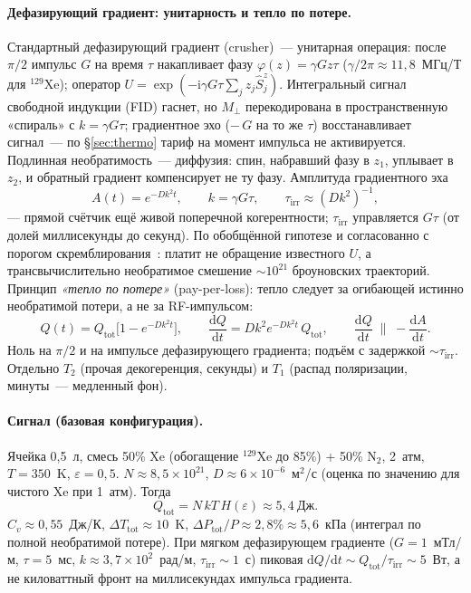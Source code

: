 \documentclass[11pt,a4paper]{article}
\newcommand{\Sref}[1]{\hyperref[#1]{\S\ref{#1}}}
\begin{document}
\paragraph{Дефазирующий градиент: унитарность и тепло по потере.}
Стандартный дефазирующий градиент (crusher)~--- унитарная операция: после $\pi/2$ импульс $G$ на время $\tau$ накапливает фазу $\varphi(z)=\gamma G z\tau$ ($\gamma/2\pi \approx 11{,}8$~МГц/Т для $^{129}$Xe); оператор $U=\exp(-\mathrm{i}\gamma G\tau\sum_j z_j\hat S_j^z)$. Интегральный сигнал свободной индукции (FID) гаснет, но $M_\perp$ перекодирована в пространственную «спираль» с $k=\gamma G\tau$; градиентное эхо ($-\,G$ на то же $\tau$) восстанавливает сигнал~--- по \Sref{sec:thermo} тариф на момент импульса не активируется. Подлинная необратимость~--- диффузия: спин, набравший фазу в $z_1$, уплывает в $z_2$, и обратный градиент компенсирует не ту фазу. Амплитуда градиентного эха
\begin{equation}
A(t)=e^{-Dk^2 t}, \qquad k=\gamma G\tau, \qquad \tau_{\mathrm{irr}}\approx (Dk^2)^{-1},
\end{equation}
--- прямой счётчик ещё живой поперечной когерентности; $\tau_{\mathrm{irr}}$ управляется $G\tau$ (от долей миллисекунды до секунд). По обобщённой гипотезе и согласованно с порогом скремблирования~\cite{ponfilenok2026threshold}: платит не обращение известного $U$, а трансвычислительно необратимое смешение $\sim 10^{21}$ броуновских траекторий. Принцип \emph{«тепло по потере»} (pay-per-loss): тепло следует за огибающей истинно необратимой потери, а не за RF-импульсом:
\begin{equation}
Q(t)=Q_{\mathrm{tot}}\bigl[1-e^{-Dk^2 t}\bigr], \qquad
\frac{\mathrm{d} Q}{\mathrm{d} t}=Dk^2 e^{-Dk^2 t}\,Q_{\mathrm{tot}}, \qquad
\frac{\mathrm{d} Q}{\mathrm{d} t}\;\parallel\;-\frac{\mathrm{d} A}{\mathrm{d} t}.
\end{equation}
Ноль на $\pi/2$ и на импульсе дефазирующего градиента; подъём с задержкой $\sim\tau_{\mathrm{irr}}$. Отдельно $T_2$ (прочая декогеренция, секунды) и $T_1$ (распад поляризации, минуты~--- медленный фон).

\paragraph{Сигнал (базовая конфигурация).}
Ячейка 0{,}5~л, смесь 50\% Xe (обогащение $^{129}$Xe до 85\%) + 50\% N$_2$, 2~атм, $T = 350$~K, $\varepsilon = 0{,}5$. $N \approx 8{,}5 \times 10^{21}$, $D\approx 6\times 10^{-6}$~м$^2$/с (оценка по значению для чистого Xe при 1~атм). Тогда
\begin{equation}
Q_{\mathrm{tot}} = N\, k T\, H(\varepsilon) \approx 5{,}4~\text{Дж}.
\end{equation}
$C_v \approx 0{,}55$~Дж/К, $\Delta T_{\mathrm{tot}}\approx 10$~K, $\Delta P_{\mathrm{tot}}/P \approx 2{,}8\% \approx 5{,}6$~кПа (интеграл по полной необратимой потере). При мягком дефазирующем градиенте ($G=1$~мТл/м, $\tau=5$~мс, $k\approx 3{,}7\times 10^2$~рад/м, $\tau_{\mathrm{irr}}\sim 1$~с) пиковая $\mathrm{d} Q/\mathrm{d} t\sim Q_{\mathrm{tot}}/\tau_{\mathrm{irr}}\sim 5$~Вт, а не киловаттный фронт на миллисекундах импульса градиента.
\end{document}
